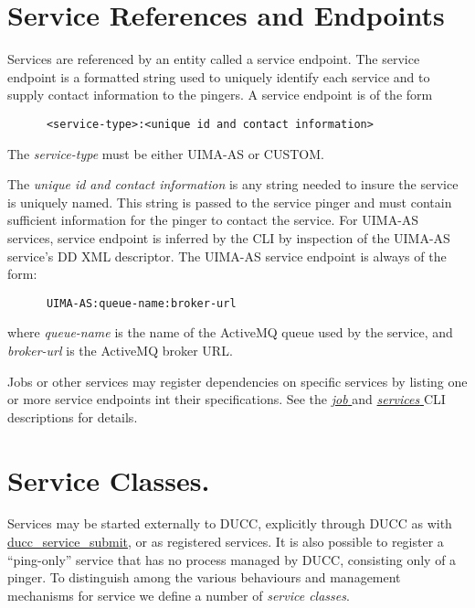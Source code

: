       \section{Service References and Endpoints} 
      \label{sec:service.endpoints}
      Services are referenced by an entity called a service
      endpoint. The service endpoint is a formatted string used to uniquely identify each
      service and to supply contact information to the pingers.  A service endpoint
      is of the form 
\begin{verbatim}
      <service-type>:<unique id and contact information>
\end{verbatim}
      
      The {\em service-type} must be either UIMA-AS or CUSTOM.
      
      The {\em unique id and contact information} is any string needed to insure the service is
      uniquely named.  This string is passed to the service pinger and must contain sufficient
      information for the pinger to contact the service.  For UIMA-AS services, service endpoint is
      inferred by the CLI by inspection of the UIMA-AS service's DD XML descriptor.  The UIMA-AS
      service endpoint is always of the form:
\begin{verbatim}
      UIMA-AS:queue-name:broker-url
\end{verbatim}
      where {\em queue-name} is the name of the ActiveMQ queue used by the service, and {\em broker-url}
      is the ActiveMQ broker URL.

      Jobs or other services may register dependencies on specific services by listing one or more
      service endpoints int their specifications. See the 
      \hyperref[sec:cli.ducc-submit]{\em job } and 
      \hyperref[sec:cli.ducc-services]{\em services } CLI descriptions for details.
      
      
      \section{Service Classes.} 
      \label{sec:service.classes}
      Services may be started externally to DUCC, explicitly through DUCC as with
      \hyperref[sec:cli.service-submit]{ducc\_service\_submit}, or as registered services.  It is
      also possible to register a ``ping-only'' service that has no process managed by DUCC,
      consisting only of a pinger.  To distinguish among the various behaviours and management
      mechanisms for service we define a number of {\em service classes}.

